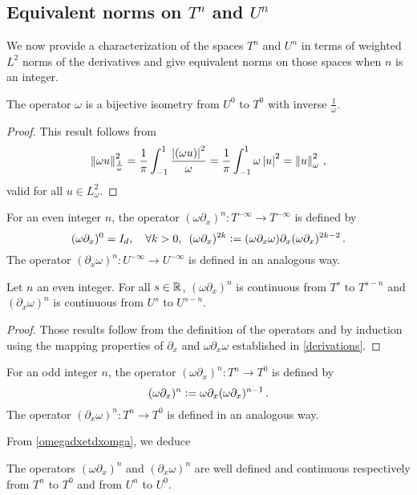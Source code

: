 \documentclass[a4paper]{article}
\begin{document}
\subsection{Equivalent norms on $T^n$ and $U^n$}
We now provide a characterization of the spaces $T^n$ and $U^n$ in terms of weighted $L^2$ norms of the derivatives and give equivalent norms on those spaces when $n$ is an integer. 
\begin{Lem}
	\label{omegadxetdxomga}
	The operator $\omega$ is a bijective isometry from $U^0$ to $T^0$ with inverse $\frac{1}{\omega}$. 
\end{Lem}
\begin{proof}
	This result follows from
	\[\left\|\omega u\right\|_\frac{1}{\omega}^2 = \frac{1}{\pi}\int_{-1}^1 \frac{\left\lvert (\omega u) \right\rvert^2}{\omega} = \frac{1}{\pi} \int_{-1}^{1} \omega \left\lvert u \right\rvert^2 = \left\|u\right\|_\omega^2\,,\]
	valid for all $u \in L^2_\omega$.
\end{proof}
\begin{Def}
	For an even integer $n$, the operator $(\omega \partial_x)^n : T^{-\infty} \to T^{-\infty}$ is defined by
	\[(\omega \partial_x)^0 = I_d,\quad \forall k > 0,\,\,\, (\omega \partial_x)^{2k} \mathrel{\mathop:}= (\omega \partial_x \omega) \partial_x (\omega \partial_x)^{2k -2}\,.\] The operator $(\partial_x \omega)^n : U^{-\infty} \to U^{-\infty}$ is defined in an analogous way. 
\end{Def}
\begin{Lem}
	\label{Lemnpair}
	Let $n$ an even integer. For all $s \in \mathbb{R}$, $(\omega \partial_x)^n$ is continuous from $T^s$ to $T^{s - n}$ and $(\partial_x \omega)^n$ is continuous from $U^s$ to $U^{s-n}$. 
\end{Lem}
\begin{proof}
	Those results follow from the definition of the operators and by induction using the mapping properties of $\partial_x$ and $\omega \partial_x \omega$ established in \autoref{derivations}. 
\end{proof}
\begin{Def}
	For an odd integer $n$, the operator $(\omega \partial_x)^n : T^n \to T^{0}$ is defined by
	\[(\omega \partial_x)^n \mathrel{\mathop:}= \omega \partial_x (\omega \partial_x)^{n-1}\,.\] 
	The operator $( \partial_x \omega)^n : T^n \to T^{0}$ is defined in an analogous way. 
\end{Def}
\noindent From \autoref{omegadxetdxomga}, we deduce 
\begin{Cor}
	\label{Lemnimpair}
	The operators $(\omega \partial_x)^n$ and $(\partial_x \omega)^n$ are well defined and continuous respectively from $T^n$ to $T^0$ and from $U^n$ to $U^0$. 
\end{Cor}
\end{document}

